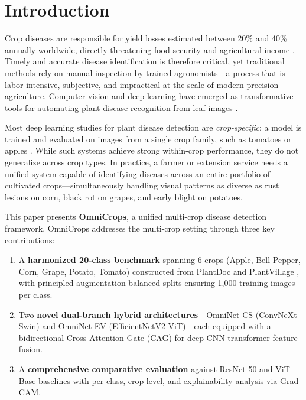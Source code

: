 \documentclass[conference]{IEEEtran}
\begin{document}
\section{Introduction}

Crop diseases are responsible for yield losses estimated between 20\% and 40\% annually worldwide, directly threatening food security and agricultural income \cite{mohanty2016,ferentinos2018}. Timely and accurate disease identification is therefore critical, yet traditional methods rely on manual inspection by trained agronomists—a process that is labor-intensive, subjective, and impractical at the scale of modern precision agriculture. Computer vision and deep learning have emerged as transformative tools for automating plant disease recognition from leaf images \cite{mohanty2016,too2019,chen2020}.

Most deep learning studies for plant disease detection are \textit{crop-specific}: a model is trained and evaluated on images from a single crop family, such as tomatoes or apples \cite{rangarajan2018,barbedo2019}. While such systems achieve strong within-crop performance, they do not generalize across crop types. In practice, a farmer or extension service needs a unified system capable of identifying diseases across an entire portfolio of cultivated crops—simultaneously handling visual patterns as diverse as rust lesions on corn, black rot on grapes, and early blight on potatoes.

This paper presents \textbf{OmniCrops}, a unified multi-crop disease detection framework. OmniCrops addresses the multi-crop setting through three key contributions:

\begin{enumerate}
    \item A \textbf{harmonized 20-class benchmark} spanning 6 crops (Apple, Bell Pepper, Corn, Grape, Potato, Tomato) constructed from PlantDoc \cite{plantdoc2020} and PlantVillage \cite{mohanty2016}, with principled augmentation-balanced splits ensuring 1{,}000 training images per class.
    \item Two \textbf{novel dual-branch hybrid architectures}—OmniNet-CS (ConvNeXt-Swin) and OmniNet-EV (EfficientNetV2-ViT)—each equipped with a bidirectional Cross-Attention Gate (CAG) for deep CNN-transformer feature fusion.
    \item A \textbf{comprehensive comparative evaluation} against ResNet-50 and ViT-Base baselines with per-class, crop-level, and explainability analysis via Grad-CAM.
\end{enumerate}
\end{document}
